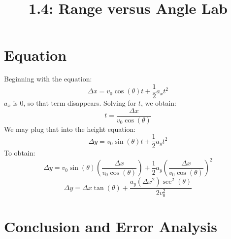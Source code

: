 \documentclass{article}
\title{1.4: Range versus Angle Lab}
\begin{document}
\section{Equation}
Beginning with the equation:
\[\Delta x = v_0\cos(\theta)t + \frac{1}{2}a_xt^2\]
$a_x$ is 0, so that term disappears. Solving for $t$, we obtain:
\[t = \frac{\Delta x}{v_0\cos(\theta)}\]
We may plug that into the height equation:
\[\Delta y = v_0\sin(\theta)t + \frac{1}{2}a_yt^2\]
To obtain:
\[\Delta y = v_0\sin(\theta)(\frac{\Delta x}{v_0\cos(\theta)}) + \frac{1}{2}a_y(\frac{\Delta x}{v_0\cos(\theta)})^2\]
\[\Delta y = \Delta x\tan(\theta) + \frac{a_y(\Delta x^2)\sec^2(\theta)}{2v_0^2}\]
\section{Conclusion and Error Analysis}
\end{document}
